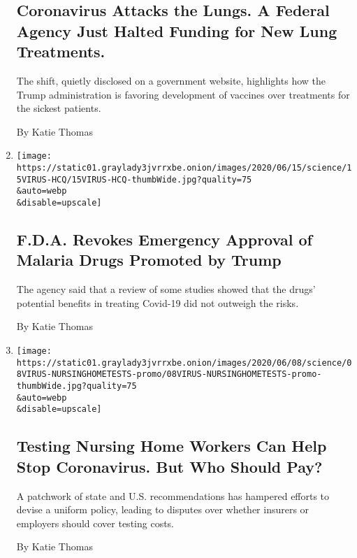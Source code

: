 \begin{enumerate}
{  \subsection{Coronavirus Attacks the Lungs. A Federal Agency Just
  Halted Funding for New Lung
  Treatments.}\label{coronavirus-attacks-the-lungs-a-federal-agency-just-halted-funding-for-new-lung-treatments}}

  The shift, quietly disclosed on a government website, highlights how
  the Trump administration is favoring development of vaccines over
  treatments for the sickest patients.

  By Katie Thomas
\item
  \href{/2020/06/15/health/fda-hydroxychloroquine-malaria.html}{}

  \texttt{[image: https://static01.graylady3jvrrxbe.onion/images/2020/06/15/science/15VIRUS-HCQ/15VIRUS-HCQ-thumbWide.jpg?quality=75\\\&auto=webp\\\&disable=upscale]}

  \hypertarget{fda-revokes-emergency-approval-of-malaria-drugs-promoted-by-trump}{%
  \subsection{F.D.A. Revokes Emergency Approval of Malaria Drugs
  Promoted by
  Trump}\label{fda-revokes-emergency-approval-of-malaria-drugs-promoted-by-trump}}

  The agency said that a review of some studies showed that the drugs'
  potential benefits in treating Covid-19 did not outweigh the risks.

  By Katie Thomas
\item
  \href{/2020/06/09/health/testing-coronavirus-nursing-homes-workers.html}{}

  \texttt{[image: https://static01.graylady3jvrrxbe.onion/images/2020/06/08/science/08VIRUS-NURSINGHOMETESTS-promo/08VIRUS-NURSINGHOMETESTS-promo-thumbWide.jpg?quality=75\\\&auto=webp\\\&disable=upscale]}

  \hypertarget{testing-nursing-home-workers-can-help-stop-coronavirus-but-who-should-pay}{%
  \subsection{Testing Nursing Home Workers Can Help Stop Coronavirus.
  But Who Should
  Pay?}\label{testing-nursing-home-workers-can-help-stop-coronavirus-but-who-should-pay}}

  A patchwork of state and U.S. recommendations has hampered efforts to
  devise a uniform policy, leading to disputes over whether insurers or
  employers should cover testing costs.

  By Katie Thomas
\end{enumerate}

